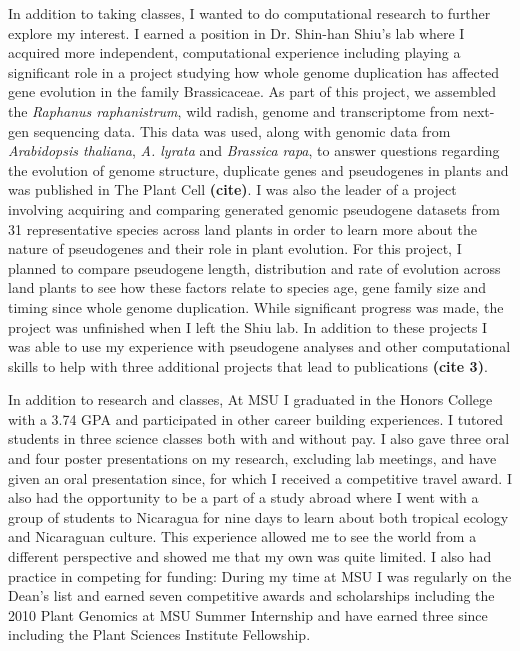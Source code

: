 \documentclass[12pt]{amsart}
\begin{document}
In addition to taking classes, I wanted to do computational research to further explore my interest.  
I earned a position in Dr. Shin-han Shiu's lab where I acquired more independent,  computational experience including playing a significant role in a project studying how whole genome duplication has affected gene evolution in the family Brassicaceae.  
As part of this project, we assembled the \textit{Raphanus raphanistrum}, wild radish, genome and transcriptome from next-gen sequencing data.  
This data was used, along with genomic data from \textit{Arabidopsis thaliana}, \textit{A. lyrata} and \textit{Brassica rapa}, to answer questions regarding the evolution of genome structure, duplicate genes and pseudogenes in plants and was published in The Plant Cell \textbf{(cite)}. 
I was also the leader of a project involving acquiring and comparing generated genomic pseudogene datasets from 31 representative species across land plants in order to learn more about the nature of pseudogenes and their role in plant evolution.  
For this project, I planned to compare pseudogene length, distribution and rate of evolution across land plants to see how these factors relate to species age, gene family size and timing since whole genome duplication.  
While significant progress was made, the project was unfinished when I left the Shiu lab.  
In addition to these projects I was able to use my experience with pseudogene analyses and other computational skills to help with three additional projects that lead to publications \textbf{(cite 3)}.

In addition to research and classes, At MSU I graduated in the Honors College with a 3.74 GPA and participated in other career building experiences.  
I tutored students in three science classes both with and without pay.
I also gave three oral and four poster presentations on my research, excluding lab meetings, and have given an oral presentation since, for which I received a competitive travel award.
I also had the opportunity to be a part of a study abroad where I went with a group of students to Nicaragua for nine days to learn about both tropical ecology and Nicaraguan culture. 
This experience allowed me to see the world from a different perspective and showed me that my own was quite limited.
I also had practice in competing for funding:
During my time at MSU I was regularly on the Dean's list and earned seven competitive awards and scholarships including the 2010 Plant Genomics at MSU Summer Internship and have earned three since including the Plant Sciences Institute Fellowship.
\end{document}
